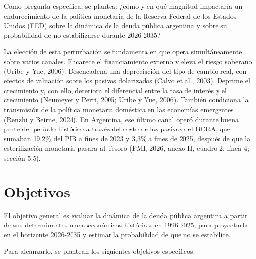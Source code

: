 Como pregunta específica, se plantea: ¿cómo y en qué magnitud impactaría
un endurecimiento de la política monetaria de la Reserva Federal de los
Estados Unidos (FED) sobre la dinámica de la deuda pública argentina y
sobre su probabilidad de no estabilizarse durante 2026-2035?

La elección de esta perturbación se fundamenta en que opera
simultáneamente sobre varios canales. Encarece el financiamiento externo
y eleva el riesgo soberano (Uribe y Yue, 2006). Desencadena una
depreciación del tipo de cambio real, con efectos de valuación sobre los
pasivos dolarizados (Calvo et al., 2003). Deprime el crecimiento y, con
ello, deteriora el diferencial entre la tasa de interés y el crecimiento
(Neumeyer y Perri, 2005; Uribe y Yue, 2006). También condiciona la
transmisión de la política monetaria doméstica en las economías
emergentes (Renzhi y Beirne, 2024). En Argentina, ese último canal operó
durante buena parte del período histórico a través del costo de los
pasivos del BCRA, que sumaban 19,2\% del PIB a fines de 2023 y 3,3\% a
fines de 2025, después de que la esterilización monetaria pasara al
Tesoro (FMI, 2026, anexo II, cuadro 2, línea 4; sección 5.5).

\section{Objetivos}

El objetivo general es evaluar la dinámica de la deuda pública argentina
a partir de sus determinantes macroeconómicos históricos en 1996-2025,
para proyectarla en el horizonte 2026-2035 y estimar la probabilidad de
que no se estabilice.

Para alcanzarlo, se plantean los siguientes objetivos específicos:

